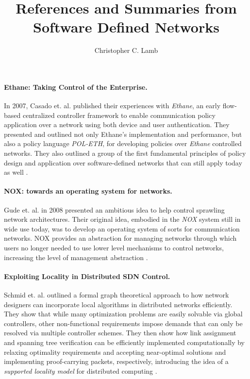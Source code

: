 \documentclass[10pt,letterpaper]{article}
\author{Christopher C. Lamb}
\title{References and Summaries from Software Defined Networks}
\begin{document}
\maketitle
\paragraph{Ethane: Taking Control of the Enterprise.} In 2007, Casado et. al. published their experiences with {\sl Ethane}, an early flow-based centralized controller framework to enable communication policy application over a network using both device and user authentication.  They presented and outlined not only Ethane's implementation and performance, but also a policy language {\sl POL-ETH}, for developing policies over {\sl Ethane} controlled networks.  They also outlined a group of the first fundamental principles of policy design and application over software-defined networks that can still apply today as well \cite{CaFrPeLu:07}.

\paragraph{NOX: towards an operating system for networks.}  Gude et. al. in 2008 presented an ambitious idea to help control sprawling network architectures.  Their original idea, embodied in the {\sl NOX} system still in wide use today, was to develop an operating system of sorts for communication networks.  NOX provides an abstraction for managing networks through which users no longer needed to use lower level mechanisms to control networks, increasing the level of management abstraction \cite{GuKoPePf:08}.

\paragraph{Exploiting Locality in Distributed SDN Control.} Schmid et. al. outlined a formal graph theoretical approach to how network designers can incorporate local algorithms in distributed networks efficiently.  They show that while many optimization problems are easily solvable via global controllers, other non-functional requirements impose demands that can only be resolved via multiple controller schemes. They then show how link assignment and spanning tree verification can be efficiently implemented computationally by relaxing optimality requirements and accepting near-optimal solutions and implementing proof-carrying packets, respectively, introducing the idea of a {\sl supported locality model} for distributed computing \cite{ScSu:13}.  
\end{document}
